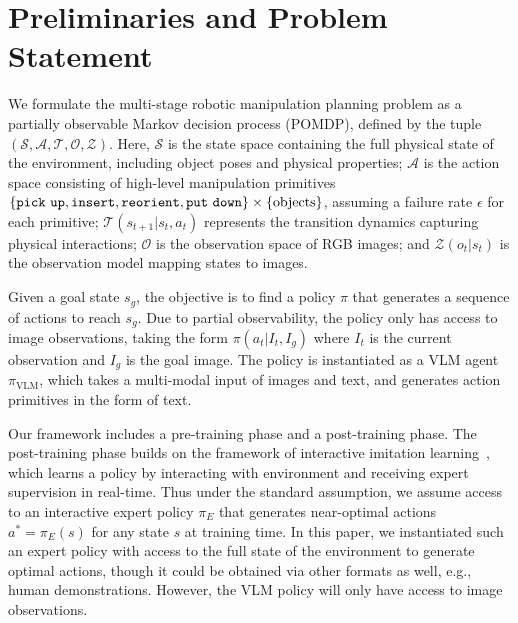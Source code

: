 \section{Preliminaries and Problem Statement}\label{sec:problem}
We formulate the multi-stage robotic manipulation planning problem as a partially observable Markov decision process (POMDP), defined by the tuple $(\mathcal{S}, \mathcal{A}, \mathcal{T}, \mathcal{O}, \mathcal{Z})$. 
Here, $\mathcal{S}$ is the state space containing the full physical state of the environment, including object poses and physical properties; $\mathcal{A}$ is the action space consisting of high-level manipulation primitives $\{{\tt pick\ up}, {\tt insert}, {\tt reorient}, {\tt put\ down}\} \times \{\text{objects}\}$, assuming a failure rate $\epsilon$ for each primitive; $\mathcal{T}(s_{t+1}|s_t,a_t)$ represents the transition dynamics capturing physical interactions; $\mathcal{O}$ is the observation space of RGB images; and $\mathcal{Z}(o_t|s_t)$ is the observation model mapping states to images.

Given a goal state $s_g$, the objective is to find a policy $\pi$ that generates a sequence of actions to reach $s_g$. Due to partial observability, the policy only has access to image observations, taking the form $\pi(a_t|I_t,I_g)$ where $I_t$ is the current observation and $I_g$ is the goal image. The policy is instantiated as a VLM agent $\pi_\text{VLM}$, which takes a multi-modal input of images and text, and generates action primitives in the form of text.

Our framework includes a pre-training phase and a post-training phase. The post-training phase builds on the framework of interactive imitation learning~\citep{dagger, Kelly2018HGDAgger}, which learns a policy by interacting with environment and receiving expert supervision in real-time. Thus under the standard assumption, we assume access to an interactive expert policy $\pi_E$ that generates near-optimal actions $a^*=\pi_E(s)$ for any state $s$ at training time. 
In this paper, we instantiated such an expert policy with access to the full state of the environment to generate optimal actions, though it could be obtained via other formats as well, e.g., human demonstrations.
However, the VLM policy will only have access to image observations.



